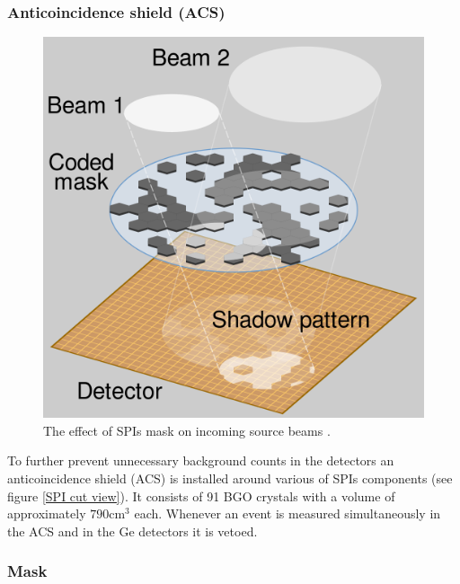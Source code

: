 \documentclass{report}
\begin{document}
\subsubsection*{Anticoincidence shield (ACS)}

\begin{figure}
  \vspace{-20pt}
  \includegraphics[width=\linewidth]{Images/General/HURA_hexagonal_coded_aperture_mask_principle.svg.png}
  \vspace{-20pt}
  \caption{The effect of SPIs mask on incoming source beams \cite{HURA}.}
  \vspace{-20pt}
  \label{HURA}
\end{figure}

To further prevent unnecessary background counts in the detectors an anticoincidence shield (ACS) is installed around various of SPIs components (see figure \ref{SPI cut view}). It consists of 91 BGO crystals with a volume of approximately $790\text{cm}^3$ each. Whenever an event is measured simultaneously in the ACS and in the Ge detectors it is vetoed. 



\subsubsection*{Mask}
\end{document}
